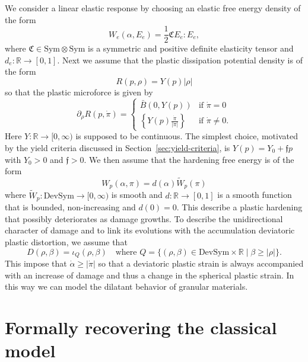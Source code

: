 \documentclass[a4paper,10pt,twoside]{amsbook}
\numberwithin{section}{chapter}
\numberwithin{equation}{chapter}
\theoremstyle{definition}
\begin{document}
We consider a linear elastic response by choosing an elastic free energy density of the form
\[
W_e(\alpha,E_e)=\frac{1}{2}\mathfrak{C}E_e:E_e,
\]
where $\mathfrak{C}\in\text{Sym}\otimes\text{Sym}$ is a symmetric and positive definite elasticity tensor and $d_e\colon\mathbb{R}\to[0,1]$. Next we assume that the plastic dissipation potential density is of the form
\[
R(p,\rho)=Y(p)|\rho|
\]
so that the plastic microforce is given by
\[
\partial_\rho R(p,\dot\pi)=\begin{cases}
\bar B(0,Y(p)) & \text{if $\dot\pi=0$} \\
\left\{Y(p)\frac{\dot\pi}{|\dot\pi|}\right\} & \text{if $\dot\pi\neq0$}.
\end{cases}
\]
Here $Y\colon\mathbb{R}\to[0,\infty)$ is supposed to be continuous. The simplest choice, motivated by the yield criteria discussed in Section~\ref{sec:yield-criteria}, is $Y(p)=Y_0+\mathfrak{f}p$ with $Y_0>0$ and $\mathfrak{f}>0$. We then assume that the hardening free energy is of the form
\[
W_p(\alpha,\pi)=d(\alpha)\tilde W_p(\pi)
\]
where $\tilde W_p\colon\text{DevSym}\to[0,\infty)$ is smooth and $d\colon\mathbb{R}\to[0,1]$ is a smooth function that is bounded, non-increasing and $d(0)=0$. This describe a plastic hardening that possibly deteriorates as damage growths. To describe the unidirectional character of damage and to link its evolutions with the accumulation deviatoric plastic distortion, we assume that
\[
D(\rho,\beta)=\iota_Q(\rho,\beta)\quad\text{where $Q=\{(\rho,\beta)\in\text{DevSym}\times\mathbb{R}\;|\;\beta\ge|\rho|\}$}.
\]
This impose that $\dot\alpha\ge|\dot\pi|$ so that a deviatoric plastic strain is always accompanied with an increase of damage and thus a change in the spherical plastic strain. In this way we can model the dilatant behavior of granular materials.

\section{Formally recovering the classical model}
\label{sec:recovering}
\end{document}
